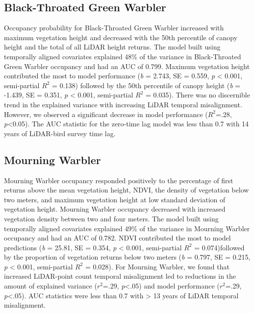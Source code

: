 \documentclass[
  12pt,
]{article}
\begin{document}
\hypertarget{black-throated-green-warbler}{%
\subsection{Black-Throated Green Warbler}\label{black-throated-green-warbler}}

Occupancy probability for Black-Throated Green Warbler increased with maximum vegetation height and decreased with the 50th percentile of canopy height and the total of all LiDAR height returns. The model built using temporally aligned covariates explained 48\% of the variance in Black-Throated Green Warbler occupancy and had an AUC of 0.799. Maximum vegetation height contributed the most to model performance (\emph{b} = 2.743, SE = 0.559, \emph{p} \textless{} 0.001, semi-partial \(R^2\) = 0.138) followed by the 50th percentile of canopy height (\emph{b} = -1.439, SE = 0.351, \emph{p} \textless{} 0.001, semi-partial \(R^2\) = 0.035). There was no discernible trend in the explained variance with increasing LiDAR temporal misalignment. However, we observed a significant decrease in model performance (\(R^2\)=.28, \emph{p}\textless0.05). The AUC statistic for the zero-time lag model was less than 0.7 with 14 years of LiDAR-bird survey time lag.

\hypertarget{mourning-warbler}{%
\subsection{Mourning Warbler}\label{mourning-warbler}}

Mourning Warbler occupancy responded positively to the percentage of first returns above the mean vegetation height, NDVI, the density of vegetation below two meters, and maximum vegetation height at low standard deviation of vegetation height. Mourning Warbler occupancy decreased with increased vegetation density between two and four meters. The model built using temporally aligned covariates explained 49\% of the variance in Mourning Warbler occupancy and had an AUC of 0.782. NDVI contributed the most to model predictions (\emph{b} = 25.81, SE = 0.354, \emph{p} \textless{} 0.001, semi-partial \(R^2\) = 0.074)followed by the proportion of vegetation returns below two meters (\emph{b} = 0.797, SE = 0.215, \emph{p} \textless{} 0.001, semi-partial \(R^2\) = 0.028). For Mourning Warbler, we found that increased LiDAR-point count temporal misalignment led to reductions in the amount of explained variance (\(r^2\)=.29, \emph{p}\textless.05) and model performance (\(r^2\)=.29, \emph{p}\textless.05). AUC statistics were less than 0.7 with \textgreater{} 13 years of LiDAR temporal misalignment.
\end{document}
